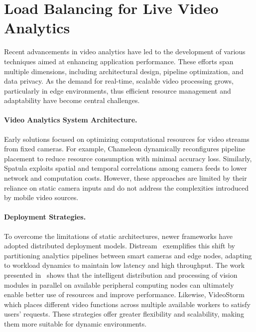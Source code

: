 \section{Load Balancing for Live Video Analytics}

Recent advancements in video analytics have led to the development of various techniques aimed at enhancing application performance. These efforts span multiple dimensions, including architectural design, pipeline optimization, and data privacy. As the demand for real-time, scalable video processing grows, particularly in edge environments, thus efficient resource management and adaptability have become central challenges.

\paragraph{Video Analytics System Architecture.}
Early solutions focused on optimizing computational resources for video streams from fixed cameras. For example, Chameleon dynamically reconfigures pipeline placement to reduce resource consumption with minimal accuracy loss. Similarly, Spatula exploits spatial and temporal correlations among camera feeds to lower network and computation costs. However, these approaches are limited by their reliance on static camera inputs and do not address the complexities introduced by mobile video sources.

\paragraph{Deployment Strategies.}
To overcome the limitations of static architectures, newer frameworks have adopted distributed deployment models. Distream~\cite{zeng2020distream} exemplifies this shift by partitioning analytics pipelines between smart cameras and edge nodes, adapting to workload dynamics to maintain low latency and high throughput. The work presented in~\cite{} shows that the intelligent distribution and processing of vision modules in parallel on available peripheral computing nodes can ultimately enable better use of resources and improve performance. Likewise, VideoStorm~\cite{201465videostorm} which places different video functions across multiple available workers to satisfy users' requests. These strategies offer greater flexibility and scalability, making them more suitable for dynamic environments.

